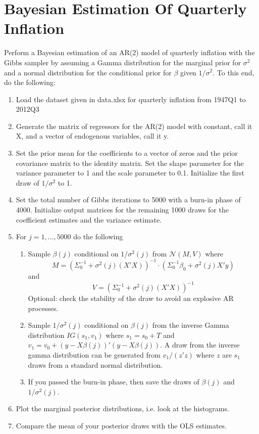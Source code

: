 \documentclass[a4paper]{scrartcl}
\begin{document}
    \section{Bayesian Estimation Of Quarterly Inflation}
    Perform a Bayesian estimation of an AR(2) model of quarterly inflation with the Gibbs sampler by assuming a Gamma distribution for the marginal prior for $\sigma^2$ and a normal distribution for the conditional prior for $\beta$ given $1/\sigma^2$. To this end, do the following:
    \begin{enumerate}
        \item Load the dataset given in data.xlsx for quarterly inflation from 1947Q1 to 2012Q3
        \item Generate the matrix of regressors for the AR(2) model with constant, call it X, and a vector of endogenous variables, call it y.
        \item Set the prior mean for the coefficients to a vector of zeros and the prior covariance matrix to the identity matrix. Set the shape parameter for the variance parameter to 1 and the scale parameter to 0.1. Initialize the first draw of $1/\sigma^2$ to 1.
        \item Set the total number of Gibbs iterations to 5000 with a burn-in phase of 4000. Initialize output matrices for the remaining 1000 draws for the coefficient estimates and the variance estimate.
        \item For $j=1,...,5000$ do the following
              \begin{enumerate}	
                  \item Sample $\beta(j)$ conditional on $1/\sigma^2(j)$ from $\mathcal{N}(M,V)$ where
                        $$M=(\Sigma_0^{-1}+\sigma^2(j) (X'X))^{-1} \cdot (\Sigma_0^{-1}\beta_0+\sigma^2(j) X'y)$$ and 
                        $$V=(\Sigma_0^{-1} +\sigma^2(j)(X'X))^{-1}$$
                        Optional: check the stability of the draw to avoid an explosive AR processes.
                  \item Sample $1/\sigma^2(j)$ conditional on $\beta(j)$ from the inverse Gamma distribution $IG(s_1,v_1)$ where $s_1 = s_0 + T$ and $v_1 = v_0 + (y-X\beta(j))'(y-X\beta(j))$. A draw from the inverse gamma distribution can be generated from $v_1/(z' z)$ where $z$ are $s_1$ draws from a standard normal distribution.
                  \item If you passed the burn-in phase, then save the draws of $\beta(j)$ and $1/\sigma^2(j)$.
              \end{enumerate}
        \item Plot the marginal posterior distributions, i.e. look at the histograms.
        \item Compare the mean of your posterior draws with the OLS estimates.
    \end{enumerate}
    
\end{document}
